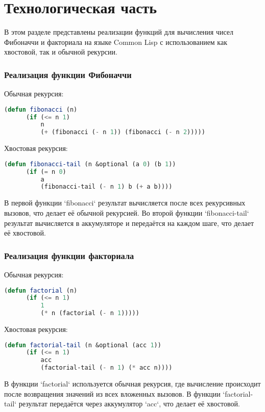 \chapter{Технологическая часть}

В этом разделе представлены реализации функций для вычисления чисел Фибоначчи и факториала на языке Common Lisp с использованием как хвостовой, так и обычной рекурсии.

\subsection{Реализация функции Фибоначчи}
Обычная рекурсия:
\begin{lstlisting}[language=Lisp, caption={Функция Фибоначчи с обычной рекурсией}]
	(defun fibonacci (n)
	  (if (<= n 1)
	      n
	      (+ (fibonacci (- n 1)) (fibonacci (- n 2)))))
\end{lstlisting}

Хвостовая рекурсия:
\begin{lstlisting}[language=Lisp, caption={Функция Фибоначчи с хвостовой рекурсией}]
	(defun fibonacci-tail (n &optional (a 0) (b 1))
	  (if (= n 0)
	      a
	      (fibonacci-tail (- n 1) b (+ a b))))
\end{lstlisting}

В первой функции `fibonacci` результат вычисляется после всех рекурсивных вызовов, что делает её обычной рекурсией. Во второй функции `fibonacci-tail` результат вычисляется в аккумуляторе и передаётся на каждом шаге, что делает её хвостовой.

\subsection{Реализация функции факториала}
Обычная рекурсия:
\begin{lstlisting}[language=Lisp, caption={Функция факториала с обычной рекурсией}]
	(defun factorial (n)
	  (if (<= n 1)
	      1
	      (* n (factorial (- n 1)))))
\end{lstlisting}

Хвостовая рекурсия:
\begin{lstlisting}[language=Lisp, caption={Функция факториала с хвостовой рекурсией}]
	(defun factorial-tail (n &optional (acc 1))
	  (if (<= n 1)
	      acc
	      (factorial-tail (- n 1) (* acc n))))
\end{lstlisting}

В функции `factorial` используется обычная рекурсия, где вычисление происходит после возвращения значений из всех вложенных вызовов. В функции `factorial-tail` результат передаётся через аккумулятор `acc`, что делает её хвостовой.

